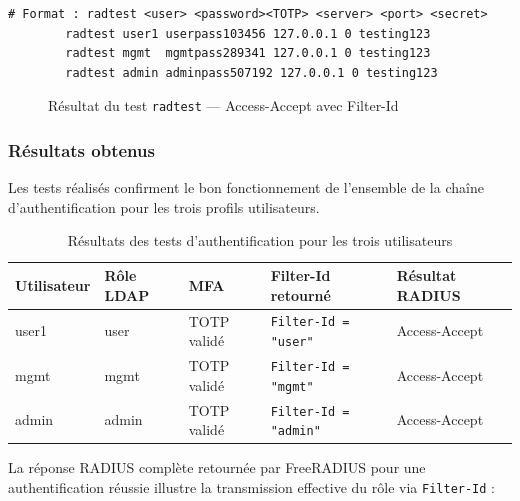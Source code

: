 \documentclass[12pt,a4paper,oneside]{report}
\begin{document}
	\begin{lstlisting}[caption={Commandes de test radtest pour les trois profils utilisateurs}]
		# Format : radtest <user> <password><TOTP> <server> <port> <secret>
		radtest user1 userpass103456 127.0.0.1 0 testing123
		radtest mgmt  mgmtpass289341 127.0.0.1 0 testing123
		radtest admin adminpass507192 127.0.0.1 0 testing123
	\end{lstlisting}
	
	\begin{figure}[H]
		\centering
		\caption{Résultat du test \texttt{radtest} --- Access-Accept avec Filter-Id}
		\label{fig:radtest-result}
	\end{figure}
	
	\subsubsection{Résultats obtenus}
	
	Les tests réalisés confirment le bon fonctionnement de l'ensemble de la
	chaîne d'authentification pour les trois profils utilisateurs.
	
	\begin{table}[H]
		\centering
		\caption{Résultats des tests d'authentification pour les trois utilisateurs}
		\renewcommand{\arraystretch}{1.4}
		\begin{tabularx}{\textwidth}{|l|l|X|X|l|}
			\hline
			\textbf{Utilisateur} & \textbf{Rôle LDAP} & \textbf{MFA} &
			\textbf{Filter-Id retourné} & \textbf{Résultat RADIUS} \\
			\hline
			user1 & user & \checkmark{} TOTP validé & \texttt{Filter-Id = "user"} &
			Access-Accept \\
			\hline
			mgmt & mgmt & \checkmark{} TOTP validé & \texttt{Filter-Id = "mgmt"} &
			Access-Accept \\
			\hline
			admin & admin & \checkmark{} TOTP validé & \texttt{Filter-Id = "admin"} &
			Access-Accept \\
			\hline
		\end{tabularx}
	\end{table}
	
	La réponse RADIUS complète retournée par FreeRADIUS pour une authentification
	réussie illustre la transmission effective du rôle via \texttt{Filter-Id} :
	
\end{document}
